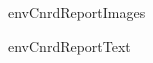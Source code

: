 \environment envCnrdReportImages

\startenvironment envCnrdReportText

\myCnrdLogo{\placefigure[none]{}{\externalfigure[cnrdLogo]}}

\stopenvironment